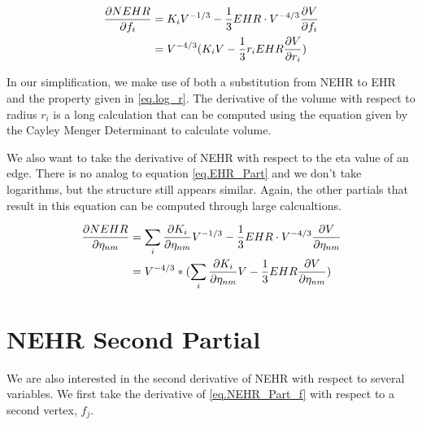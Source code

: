 \documentclass[12pt]{article}
\begin{document}
\begin{align}
\frac{\partial NEHR}{\partial f_{i}}& =K_{i}V^{-1/3}-\frac{1}{3}EHR\cdot
V^{-4/3}\frac{\partial V}{\partial f_{i}}  \notag \\
& =V^{-4/3}(K_{i}V-\frac{1}{3}r_{i}EHR\frac{\partial V}{\partial r_{i}})
\label{eq.NEHR_Part_f}
\end{align}

In our simplification, we make use of both a substitution from NEHR to EHR
and the property given in \ref{eq.log_r}. The derivative of the volume with
respect to radius $r_i$ is a long calculation that can be computed using the
equation given by the Cayley Menger Determinant to calculate volume.

We also want to take the derivative of NEHR with respect to the eta value of
an edge. There is no analog to equation \ref{eq.EHR_Part} and we don't take
logarithms, but the structure still appears similar. Again, the other
partials that result in this equation can be computed through large
calcualtions.

\begin{align}
\frac{\partial NEHR}{\partial \eta _{nm}}& =\sum_{i}{\frac{\partial K_{i}}{%
\partial \eta _{nm}}}V^{-1/3}-\frac{1}{3}EHR\cdot V^{-4/3}\frac{\partial V}{%
\partial \eta _{nm}}  \notag \\
& =V^{-4/3}\ast (\sum_{i}{\frac{\partial K_{i}}{\partial \eta _{nm}}}V-\frac{%
1}{3}EHR\frac{\partial V}{\partial \eta _{nm}})  \label{eq.NEHR_Part_eta}
\end{align}

\section{NEHR Second Partial}

We are also interested in the second derivative of NEHR with respect to
several variables. We first take the derivative of \ref{eq.NEHR_Part_f} with
respect to a second vertex, $f_j$.
\end{document}
